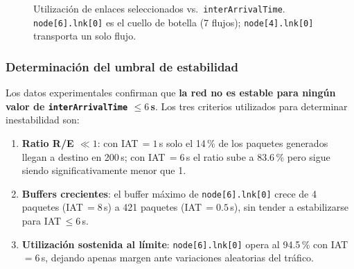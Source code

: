 \documentclass[10pt,letterpaper,twocolumn]{article}
\begin{document}
\begin{figure}[!t]
  \centering
  \caption{Utilización de enlaces seleccionados vs.\ \texttt{interArrivalTime}.
           \texttt{node[6].lnk[0]} es el cuello de botella (7 flujos);
           \texttt{node[4].lnk[0]} transporta un solo flujo.}
  \label{fig:caso2-util}
\end{figure}

\subsubsection*{Determinación del umbral de estabilidad}

Los datos experimentales confirman que \textbf{la red no es estable para
ningún valor de \texttt{interArrivalTime} $\leq 6$\,s}. Los tres criterios
utilizados para determinar inestabilidad son:

\begin{enumerate}
  \item \textbf{Ratio R/E $\ll 1$}: con IAT\,$=1$\,s solo el 14\,\% de
        los paquetes generados llegan a destino en 200\,s; con
        IAT\,$=6$\,s el ratio sube a 83.6\,\% pero sigue siendo
        significativamente menor que 1.
  \item \textbf{Buffers crecientes}: el buffer máximo de
        \texttt{node[6].lnk[0]} crece de 4 paquetes (IAT\,$=8$\,s)
        a 421 paquetes (IAT\,$=0.5$\,s), sin tender a estabilizarse
        para IAT\,$\leq 6$\,s.
  \item \textbf{Utilización sostenida al límite}: \texttt{node[6].lnk[0]}
        opera al 94.5\,\% con IAT\,$=6$\,s, dejando apenas margen
        ante variaciones aleatorias del tráfico.
\end{enumerate}
\end{document}
